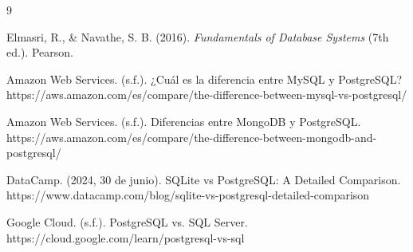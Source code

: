 \renewcommand{\refname}{\section{Referencias}}
\begin{thebibliography}{9}
    
Elmasri, R., \& Navathe, S. B. (2016). \textit{Fundamentals of Database Systems} (7th ed.). Pearson.

Amazon Web Services. (s.f.). ¿Cuál es la diferencia entre MySQL y PostgreSQL? https://aws.amazon.com/es/compare/the-difference-between-mysql-vs-postgresql/

Amazon Web Services. (s.f.). Diferencias entre MongoDB y PostgreSQL. https://aws.amazon.com/es/compare/the-difference-between-mongodb-and-postgresql/

DataCamp. (2024, 30 de junio). SQLite vs PostgreSQL: A Detailed Comparison. https://www.datacamp.com/blog/sqlite-vs-postgresql-detailed-comparison

Google Cloud. (s.f.). PostgreSQL vs. SQL Server. https://cloud.google.com/learn/postgresql-vs-sql
\end{thebibliography}
